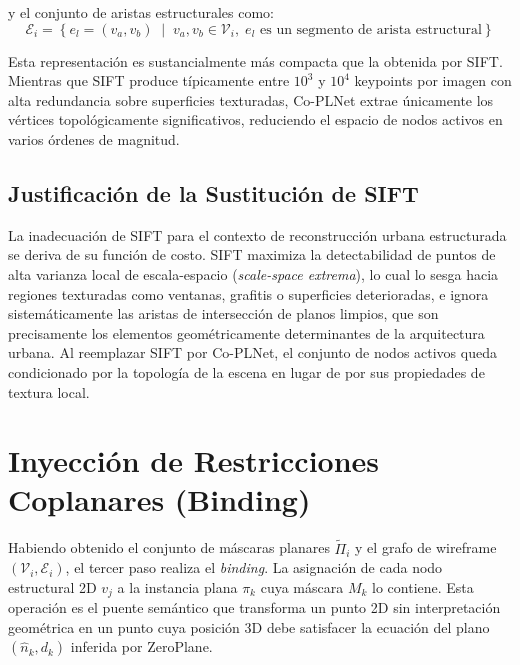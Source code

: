 y el conjunto de aristas estructurales como:
\begin{equation}
    \mathcal{E}_i = \left\{ e_l = (v_a, v_b) \;\middle|\; v_a, v_b \in \mathcal{V}_i,\; e_l \text{ es un segmento de arista estructural} \right\}
\end{equation}
 
Esta representación es sustancialmente más compacta que la obtenida por SIFT. Mientras que SIFT produce típicamente entre $10^3$ y $10^4$ keypoints por imagen con alta redundancia sobre superficies texturadas, Co-PLNet extrae únicamente los vértices topológicamente significativos, reduciendo el espacio de nodos activos en varios órdenes de magnitud.
 
\subsection{Justificación de la Sustitución de SIFT}
 
La inadecuación de SIFT para el contexto de reconstrucción urbana estructurada se deriva de su función de costo. SIFT maximiza la detectabilidad de puntos de alta varianza local de escala-espacio (\textit{scale-space extrema}), lo cual lo sesga hacia regiones texturadas como ventanas, grafitis o superficies deterioradas, e ignora sistemáticamente las aristas de intersección de planos limpios, que son precisamente los elementos geométricamente determinantes de la arquitectura urbana. Al reemplazar SIFT por Co-PLNet, el conjunto de nodos activos queda condicionado por la topología de la escena en lugar de por sus propiedades de textura local.

\section{Inyección de Restricciones Coplanares (Binding)}

Habiendo obtenido el conjunto de máscaras planares $\tilde{\Pi}_i$ y el grafo de wireframe $(\mathcal{V}_i, \mathcal{E}_i)$, el tercer paso realiza el \textit{binding}. La asignación de cada nodo estructural 2D $v_j$ a la instancia plana $\pi_k$ cuya máscara $M_k$ lo contiene. Esta operación es el puente semántico que transforma un punto 2D sin interpretación geométrica en un punto cuya posición 3D debe satisfacer la ecuación del plano $(\hat{n}_k, d_k)$ inferida por ZeroPlane.
 
